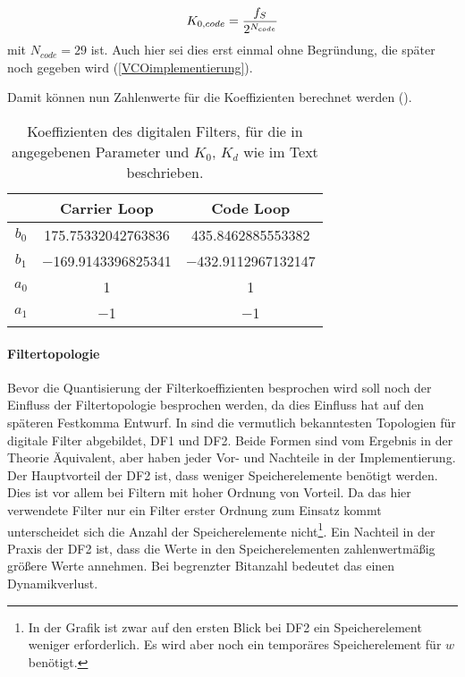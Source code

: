 \begin{equation}
    K_{0,code} = \frac{f_S}{2^{N_{code}}}
\end{equation}
mit $N_{code}=29$ ist. Auch hier sei dies erst einmal ohne Begründung, die später noch gegeben wird (\ref{VCOimplementierung}).

Damit können nun Zahlenwerte für die Koeffizienten berechnet werden (). 
\begin{table}[htbp]
    \ttabbox
    {
        \caption[Filter Koeffizienten]{Koeffizienten des digitalen Filters, für die in  angegebenen Parameter und $K_0$, $K_d$ wie im Text beschrieben.}
        \label{TabFilterKoeff}
    }
    {
    \begin{tabular}{c c c}
        \toprule
                & Carrier Loop      & Code Loop     \\
        \midrule
        $b_0$   &  \num{175.75332042763836}    & \num{435.8462885553382} \\
        $b_1$   &  \num{-169.9143396825341}   &  \num{-432.9112967132147}\\
        $a_0$   &  \num{1}          &  \num{1}      \\
        $a_1$   &  \num{-1}         &  \num{-1}     \\
        \bottomrule
    \end{tabular}
}
\end{table}

\paragraph{Filtertopologie}
Bevor die Quantisierung der Filterkoeffizienten besprochen wird soll noch der Einfluss der Filtertopologie besprochen werden, da dies Einfluss hat auf den späteren Festkomma Entwurf. In  sind die vermutlich bekanntesten Topologien für digitale Filter abgebildet, DF1 und DF2. Beide Formen sind vom Ergebnis in der Theorie Äquivalent, aber haben jeder Vor- und Nachteile in der Implementierung. Der Hauptvorteil der DF2 ist, dass weniger Speicherelemente benötigt werden. Dies ist vor allem bei Filtern mit hoher Ordnung von Vorteil. Da das hier verwendete Filter nur ein Filter erster Ordnung zum Einsatz kommt unterscheidet sich die Anzahl der Speicherelemente nicht\footnote{In der Grafik ist zwar auf den ersten Blick bei DF2 ein Speicherelement weniger erforderlich. Es wird aber noch ein temporäres Speicherelement für $w$ benötigt.}. Ein Nachteil in der Praxis der DF2 ist, dass die Werte in den Speicherelementen zahlenwertmäßig größere Werte annehmen. Bei begrenzter Bitanzahl bedeutet das einen Dynamikverlust.

